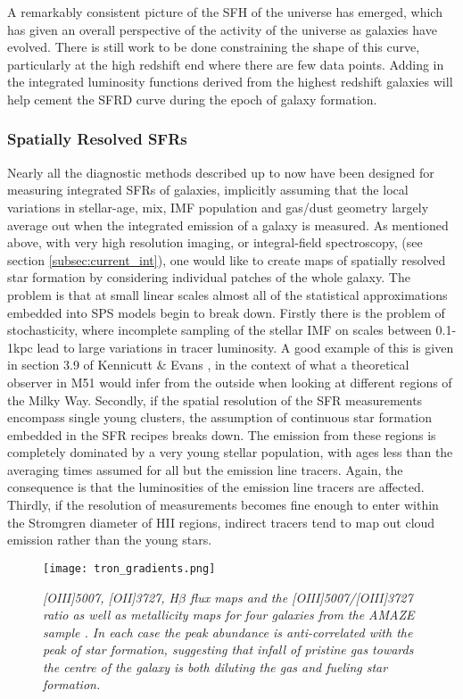 \documentclass{literature}
\begin{document}
A remarkably consistent picture of the SFH of the universe has emerged, which has given an overall perspective of the activity of the universe as galaxies have evolved. There is still work to be done constraining the shape of this curve, particularly at the high redshift end where there are few data points. Adding in the integrated luminosity functions derived from the highest redshift galaxies will help cement the SFRD curve during the epoch of galaxy formation. 

\subsubsection{Spatially Resolved SFRs}\label{subsubsec:spat_res}
Nearly all the diagnostic methods described up to now have been designed for measuring integrated SFRs of galaxies, implicitly assuming that the local variations in stellar-age, mix, IMF population and gas/dust geometry largely average out when the integrated emission of a galaxy is measured. As mentioned above, with very high resolution imaging, or integral-field spectroscopy, (see section \ref{subsec:current_int}), one would like to create maps of spatially resolved star formation by considering individual patches of the whole galaxy. The problem is that at small linear scales almost all of the statistical approximations embedded into SPS models begin to break down. Firstly there is the problem of stochasticity, where incomplete sampling of the stellar IMF on scales between 0.1-1kpc lead to large variations in tracer luminosity. A good example of this is given in section 3.9 of Kennicutt $\&$ Evans \citep{Kennicutt_2012}, in the context of what a theoretical observer in M51 would infer from the outside when looking at different regions of the Milky Way. Secondly, if the spatial resolution of the SFR measurements encompass single young clusters, the assumption of continuous star formation embedded in the SFR recipes breaks down. The emission from these regions is completely dominated by a very young stellar population, with ages less than the averaging times assumed for all but the emission line tracers. Again, the consequence is that the luminosities of the emission line tracers are affected. Thirdly, if the resolution of measurements becomes fine enough to enter within the Stromgren diameter of HII regions, indirect tracers tend to map out cloud emission rather than the young stars. \\ 

\begin{figure}[!htp]
\centering
\texttt{[image: tron\_gradients.png]}
\caption{\footnotesize{\emph{[OIII]5007, [OII]3727, H$\beta$ flux maps and the [OIII]5007/[OIII]3727 ratio as well as metallicity maps for four galaxies from the AMAZE sample \citep{Troncoso_2014}. In each case the peak abundance is anti-correlated with the peak of star formation, suggesting that infall of pristine gas towards the centre of the galaxy is both diluting the gas and fueling star formation.}}}
\label{fig:met_gradients}
\end{figure} 
\end{document}

